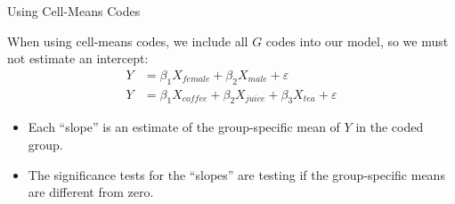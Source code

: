 \documentclass{beamer}\usepackage[]{graphicx}\usepackage[]{color}
\begin{document}

\begin{frame}{Using Cell-Means Codes}
  
  When using cell-means codes, we include all $G$ codes into our model, so we 
  must not estimate an intercept:
   \begin{align*}
    Y &= \beta_1 X_{female} + \beta_2 X_{male} + \varepsilon\\[6pt]
    Y &= \beta_1 X_{coffee} + \beta_2 X_{juice} + \beta_3 X_{tea} + \varepsilon
   \end{align*}
   \begin{itemize}
   \item Each ``slope'' is an estimate of the group-specific mean of $Y$ in the 
     coded group.
     \vc
   \item The significance tests for the ``slopes'' are testing if the 
     group-specific means are different from zero.
   \end{itemize}
   
\end{frame}

\watermarkoff %
\end{document}
